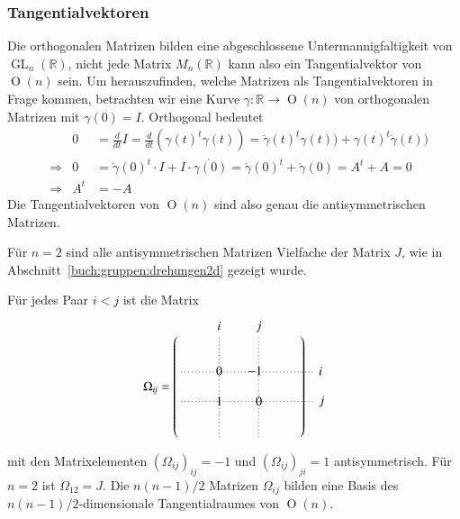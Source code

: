 \subsubsection{Tangentialvektoren}
Die orthogonalen Matrizen bilden eine abgeschlossene Untermannigfaltigkeit
von $\operatorname{GL}_n(\mathbb{R})$, nicht jede Matrix $M_n(\mathbb{R})$ 
kann also ein Tangentialvektor von $\operatorname{O}(n)$ sein.
Um herauszufinden, welche Matrizen als Tangentialvektoren in Frage
kommen, betrachten wir eine Kurve
$\gamma\colon\mathbb{R}\to \operatorname{O}(n)$
von orthogonalen Matrizen mit $\gamma(0)=I$.
Orthogonal bedeutet 
\[
\begin{aligned}
&&
0
&=
\frac{d}{dt}I
=
\frac{d}{dt}
(\gamma(t)^t\gamma(t))
=
\dot{\gamma}(t)^t\gamma(t))
+
\gamma(t)^t\dot{\gamma}(t))
\\
&\Rightarrow&
0
&=
\dot{\gamma}(0)^t \cdot I + I\cdot \dot{\gamma(0)}
=
\dot{\gamma}(0)^t + \dot{\gamma}(0)
=
A^t+A=0
\\
&\Rightarrow&
A^t&=-A
\end{aligned}
\]
Die Tangentialvektoren von $\operatorname{O}(n)$ sind also genau
die antisymmetrischen Matrizen.
%

Für $n=2$ sind alle antisymmetrischen Matrizen Vielfache der Matrix
$J$, wie in Abschnitt~\ref{buch:gruppen:drehungen2d}
gezeigt wurde.

Für jedes Paar $i<j$ ist die Matrix
\begin{equation}
\begin{tikzpicture}[>=latex,thick,baseline=(O)]
\coordinate (O) at (0,0);
\draw[dotted,color=gray] (-1.2,0.42) -- (2.5,0.42);
\draw[dotted,color=gray] (-1.2,-0.4) -- (2.5,-0.4);
\draw[dotted,color=gray] (-0.14,-1.4) -- (-0.14,1.4);
\draw[dotted,color=gray] (0.96,-1.4) -- (0.96,1.4);
\node at (2.5,0.42) [right] {$i\mathstrut$};
\node at (2.5,-0.40) [right] {$j\mathstrut$};
\node at (-0.14,1.4) [above] {$i\mathstrut$};
\node at (0.96,1.4) [above] {$j\mathstrut$};
\node at (0,0) {$\displaystyle
\Omega_{i\!j}
=
\begin{pmatrix*}[r]
& & & & &  & & & \\
& & & & &  & & & \\
& & &0& &-1& & & \\
& & & & &  & & & \\
& & &1& & 0& & & \\
& & & & &  & & & \\
& & & & &  & & &
\end{pmatrix*}
$};
\end{tikzpicture}
\label{buch:gruppen:eqn:Omega}
\end{equation}
mit den Matrixelementen
$(\Omega_{i\!j})_{i\!j}=-1$ und $(\Omega_{i\!j})_{ji}=1$
antisymmetrisch.
Für $n=2$ ist $\Omega_{12}=J$.
Die $n(n-1)/2$ Matrizen $\Omega_{i\!j}$ bilden eine Basis des
$n(n-1)/2$-dimensionale Tangentialraumes von $\operatorname{O}(n)$.

